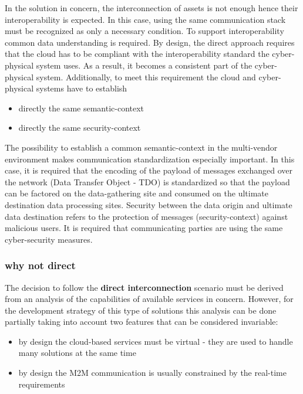 \documentclass[
]{article}
\providecommand{\tightlist}{%
  \setlength{\itemsep}{0pt}\setlength{\parskip}{0pt}}
\begin{document}
In the solution in concern, the interconnection of assets is not enough
hence their interoperability is expected. In this case, using the same
communication stack must be recognized as only a necessary condition. To
support interoperability common data understanding is required. By
design, the direct approach requires that the cloud has to be compliant
with the interoperability standard the cyber-physical system uses. As a
result, it becomes a consistent part of the cyber-physical system.
Additionally, to meet this requirement the cloud and cyber-physical
systems have to establish

\begin{itemize}
\tightlist
\item
  directly the same semantic-context
\item
  directly the same security-context
\end{itemize}

The possibility to establish a common semantic-context in the
multi-vendor environment makes communication standardization especially
important. In this case, it is required that the encoding of the payload
of messages exchanged over the network (Data Transfer Object - TDO) is
standardized so that the payload can be factored on the data-gathering
site and consumed on the ultimate destination data processing sites.
Security between the data origin and ultimate data destination refers to
the protection of messages (security-context) against malicious users.
It is required that communicating parties are using the same
cyber-security measures.

\hypertarget{why-not-direct}{%
\subsubsection{why not direct}\label{why-not-direct}}

The decision to follow the \textbf{direct interconnection} scenario must
be derived from an analysis of the capabilities of available services in
concern. However, for the development strategy of this type of solutions
this analysis can be done partially taking into account two features
that can be considered invariable:

\begin{itemize}
\tightlist
\item
  by design the cloud-based services must be virtual - they are used to
  handle many solutions at the same time
\item
  by design the M2M communication is usually constrained by the
  real-time requirements
\end{itemize}
\end{document}
